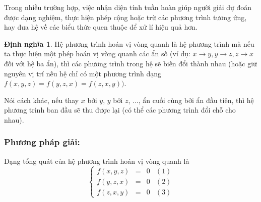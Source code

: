 \documentclass[12pt,a4paper,oneside]{book}
\theoremstyle{theorem}
\theoremstyle{definition}
\newtheorem{dn}[theorem2]{Định nghĩa}
\begin{document}
Trong nhiều trường hợp, việc nhận diện tính tuần hoàn giúp người giải dự đoán
được dạng nghiệm, thực hiện phép cộng hoặc trừ các phương trình tương ứng,
hay đưa hệ về các biểu thức quen thuộc để xử lí hiệu quả hơn.

\begin{dn}
    Hệ phương trình hoán vị vòng quanh là hệ phương trình mà nếu ta thực hiện một phép hoán vị vòng quanh các ẩn số (ví dụ: $x\to y, y \to z, z \to x$ đối với hệ ba ẩn), thì các phương trình trong hệ sẽ biến đổi thành nhau (hoặc giữ nguyên vị trí nếu hệ chỉ có một phương trình dạng $f(x,y,z) = f(y,z,x) = f(z,x,y))$.
    
Nói cách khác, nếu thay $x$ bởi $y$, $y$ bởi $z$, ..., ẩn cuối cùng bởi ẩn đầu tiên, thì hệ phương trình ban đầu sẽ thu được lại (có thể các phương trình đổi chỗ cho nhau).
\end{dn}
\subsubsection{Phương pháp giải:} Dạng tổng quát của hệ phương trình hoán vị vòng quanh là
\[\left\{
\begin{array}{lclcl}
\displaystyle f(x,y,z)&=& 0&(1)\\[1.5ex]
\displaystyle f(y,z,x)&=&0&(2)\\[1.5ex]
\displaystyle f(z,x,y)&=&0&(3)
\end{array}
\right.\]
\end{document}
